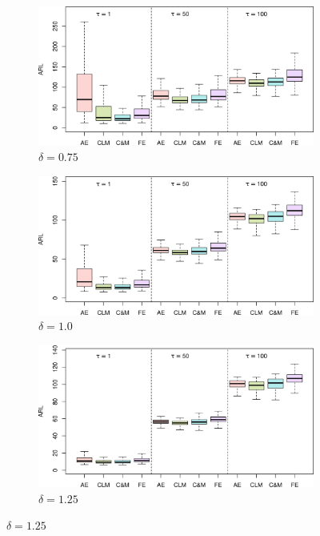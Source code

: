 \begin{figure}
\begin{subfigure}{0.49\textwidth}
\end{subfigure}
\begin{subfigure}{0.49\textwidth}
  \centering
  \caption{$ \delta = 0.75$}
  \label{fig:lambda=0.20/theta=4.0/delta=0.75}
  \includegraphics[width=\textwidth]{img/sims/theta=4.0_signedEWMA(l = 0.2, upw = true, L = 1.0)/delta=0.75.png}
\end{subfigure}
\begin{subfigure}{0.49\textwidth}
  \centering
  \caption{$ \delta = 1.0$}
  \label{fig:lambda=0.20/theta=4.0/delta=1.0}
  \includegraphics[width=\textwidth]{img/sims/theta=4.0_signedEWMA(l = 0.2, upw = true, L = 1.0)/delta=1.00.png}
\end{subfigure}
\begin{subfigure}{0.49\textwidth}
  \centering
  \caption{$ \delta = 1.25$}
  \label{fig:lambda=0.20/theta=4.0/delta=1.25}
  \includegraphics[width=\textwidth]{img/sims/theta=4.0_signedEWMA(l = 0.2, upw = true, L = 1.0)/delta=1.25.png}

\end{subfigure}
\end{figure}

